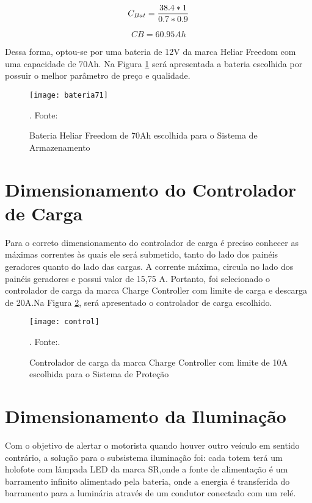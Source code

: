 \begin{equation}
    C_{Bat} = \frac{38.4*1}{0.7*0.9}\\
\end{equation}

\begin{equation}
    CB = 60.95 Ah
\end{equation}


Dessa forma, optou-se por uma bateria de 12V da marca Heliar Freedom com uma capacidade de 70Ah. Na Figura \ref{fig:bateria71} será apresentada a bateria escolhida por possuir o melhor parâmetro de preço e qualidade.


\begin{figure}[H]
\centering
\texttt{[image: bateria71]}
\caption{Bateria Heliar Freedom de 70Ah escolhida para o Sistema de Armazenamento}. Fonte: %
\label{fig:bateria71}
\end{figure}
\FloatBarrier

\section{Dimensionamento do Controlador de Carga}

Para o correto dimensionamento do controlador de carga é preciso conhecer as máximas correntes às quais ele será submetido, tanto do lado dos painéis geradores quanto do lado das cargas. A corrente máxima, circula no lado dos painéis geradores e possui valor de 15,75 A. Portanto, foi selecionado o controlador de carga da marca Charge Controller com limite de carga e descarga de 20A.Na Figura \ref{fig:control}, será apresentado o controlador de carga escolhido.

\begin{figure}[H]
\centering
\texttt{[image: control]}
    \caption{Controlador de carga da marca Charge Controller com limite de 10A escolhida para o Sistema de Proteção}. Fonte:\cite{controlador}.
\label{fig:control}
\end{figure}
\FloatBarrier

\section{Dimensionamento da Iluminação}

Com o objetivo de alertar o motorista quando houver outro veículo em sentido contrário, a solução para o subsistema iluminação foi: cada totem terá um holofote com lâmpada LED da marca SR,onde a fonte de alimentação é um barramento infinito alimentado pela bateria, onde a energia é transferida do barramento para a luminária através de um condutor conectado com um relé. 

